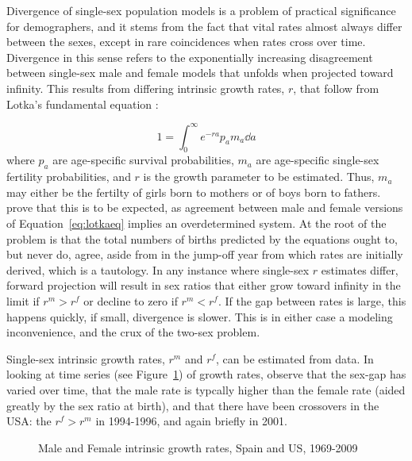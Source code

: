 
Divergence of single-sex population models is a problem of practical
significance for demographers, and it stems from the fact that vital rates almost always
differ between the sexes, except in rare coincidences when rates cross over
time. Divergence in this sense refers to the exponentially increasing
disagreement between single-sex male and female models that unfolds when
projected toward infinity. This results from differing intrinsic growth rates,
$r$, that follow from Lotka's fundamental equation \citep{sharpe1911problem}:

\begin{equation}
\label{eq:lotkaeq}
1 = \int _0 ^\infty e^{-ra}p_a m_a \dd a 
\end{equation}
where $p_a$ are age-specific survival probabilities, $m_a$ are age-specific
single-sex fertility probabilities, and $r$ is the growth parameter to be
estimated. Thus, $m_a$ may either be the fertilty of girls born to mothers or of
boys born to fathers. \citet{yellin1977comparison} prove that this is to be
expected, as agreement between male and female versions of
 Equation~\eqref{eq:lotkaeq} implies an overdetermined
system. At the root of the problem is that the total numbers of births predicted
by the equations ought to, but never do, agree, aside from in the jump-off year
from which rates are initially derived, which is a tautology. In any instance
where single-sex $r$ estimates differ, forward projection will result in sex ratios 
that either grow toward infinity in the limit if $r^m
> r^f$ or decline to zero if $r^m < r^f$. If the gap between rates is large, this happens
quickly, if small, divergence is slower. This is in either case a modeling
inconvenience, and the crux of the two-sex problem. 

Single-sex intrinsic growth rates, $r^m$ and $r^f$, can be 
estimated from data. In looking at time series (see Figure~\ref{fig:rmf}) of 
 growth rates, observe that the sex-gap has varied over 
time, that the male rate is typcally higher than the female rate (aided greatly 
by the sex ratio at birth), and that there have been crossovers in the USA: 
the $r^f > r^m$ in 1994-1996, and again briefly in 2001. 

\begin{figure}[ht!]
        \centering  
          \caption{Male and Female intrinsic growth rates, Spain and US,
          1969-2009}
          \label{fig:rmf}
\end{figure}

